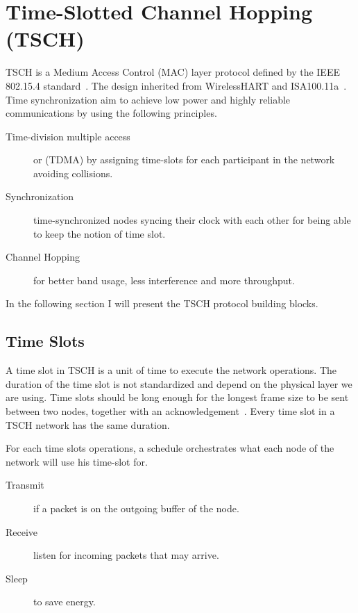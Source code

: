 
\section{Time-Slotted Channel Hopping (TSCH)}

TSCH is a Medium Access Control (MAC) layer protocol defined by the IEEE
802.15.4 standard~\cite{rfc7554}.
The design inherited from WirelessHART and
ISA100.11a~\cite{Duquennoy2017TSCHA6}.
Time synchronization aim to achieve low power and highly reliable
communications by using the following principles.

\begin{description}
  \item[Time-division multiple access] or (TDMA) by assigning time-slots for each
    participant in the network avoiding collisions.
  \item[Synchronization] time-synchronized nodes syncing their clock with each
    other for being able to keep the notion of time slot.
  \item[Channel Hopping] for better band usage, less interference and more
    throughput.
\end{description}

In the following section I will present the TSCH protocol building blocks.

\subsection{Time Slots}

A time slot in TSCH is a unit of time to execute the network operations. 
The duration of the time slot is not standardized and depend on the physical 
layer we are using. 
Time slots should be long enough for the longest frame size to be sent
between two nodes, together with an acknowledgement~\cite{rfc7554}. 
Every time slot in a TSCH network has the same duration.

For each time slots operations, a schedule orchestrates what each
node of the network will use his time-slot for.

\begin{description}
  \item [Transmit] if a packet is on the outgoing buffer of the node.
  \item [Receive] listen for incoming packets that may arrive.
  \item [Sleep] to save energy.
\end{description}

